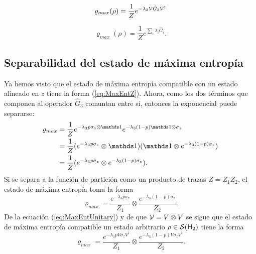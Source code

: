 \noindent\begin{minipage}{.5\linewidth}
    \begin{equation}\label{eq:MaxEntUnitary}
        \varrho_{max}(\rho)=\frac{1}{Z}e^{-\lambda_{3}\mathcal{V}\hat{G}_{3}\mathcal{V}^{\dag}}
    \end{equation}
    \end{minipage}%
    \begin{minipage}{.5\linewidth}
    \begin{equation}\label{eq:MaxEntLambdas}
        \varrho_{max}(\rho)=\frac{1}{Z}e^{\sum_{i}\lambda_{i}\hat{G}_{i}}.
    \end{equation}
    \end{minipage}

\subsection{Separabilidad del estado de máxima entropía}
Ya hemos visto que el estado de máxima entropía compatible con un estado alineado en $z$ tiene la forma (\ref{eq:MaxEntZ}). Ahora, como los dos términos que componen al operador $\hat{G}_{3}$ comuntan entre sí, entonces la exponencial puede separarse:
\begin{align*}
\varrho_{max}&=\frac{1}{Z}e^{-\lambda_{3}p\sigma_{z}\otimes\Id}e^{-\lambda_{3}(1-p)\Id\otimes\sigma_{z}}\\
&=\frac{1}{Z}(e^{-\lambda_{3}p\sigma_{z}}\otimes\Id)( \Id\otimes e^{-\lambda_{3}(1-p)\sigma_{z}})\\
&=\frac{1}{Z}(e^{-\lambda_{3}p\sigma_{z}}\otimes e^{-\lambda_{3}(1-p)\sigma_{z}}).\\
\end{align*}
Si se separa a la función de partición como un producto de trazas $Z=Z_{1}Z_{2}$, el estado de máxima entropía toma la forma
\begin{equation}\label{eq:MaxEntZ}
\varrho_{max}=\frac{e^{-\lambda_{3}p\sigma_{z}}}{Z_{1}} \otimes \frac{e^{-\lambda_{3}(1-p)\sigma_{z}}}{Z_{2}}.
\end{equation}
De la ecuación (\ref{eq:MaxEntUnitary}) y de que $\mathcal{V}=V\otimes V$ se sigue que el estado de máxima entropía compatible un estado arbitrario $\rho\in\mathcal{S}({\sf H}_{2})$ tiene la forma
\begin{equation}\label{eq:MaxEntSeparable}
    \varrho_{max}=\frac{e^{-\lambda_{3}pV\sigma_{z}V^{\dag}}}{Z_{1}} \otimes \frac{e^{-\lambda_{3}(1-p)V\sigma_{z}V^{\dag}}}{Z_{2}}.
\end{equation}

